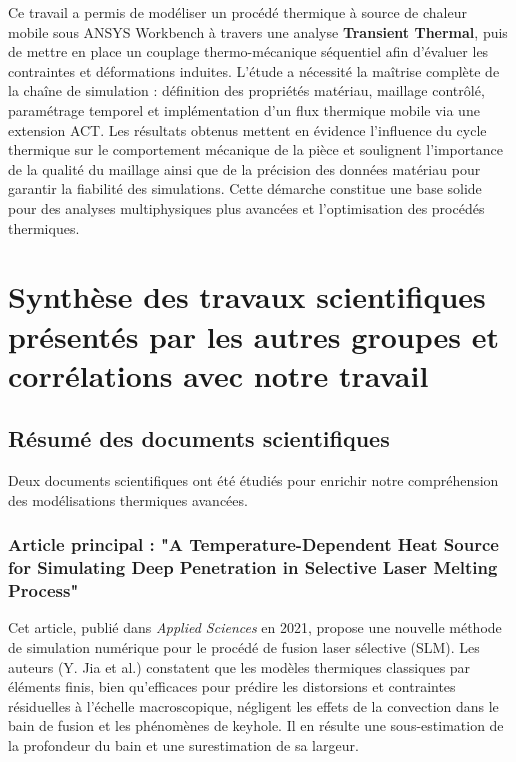 \documentclass{rapportECL}
\begin{document}
Ce travail a permis de modéliser un procédé thermique à source de chaleur mobile sous ANSYS Workbench à travers une analyse \textbf{Transient Thermal}, puis de mettre en place un couplage thermo-mécanique séquentiel afin d’évaluer les contraintes et déformations induites. L’étude a nécessité la maîtrise complète de la chaîne de simulation : définition des propriétés matériau, maillage contrôlé, paramétrage temporel et implémentation d’un flux thermique mobile via une extension ACT. Les résultats obtenus mettent en évidence l’influence du cycle thermique sur le comportement mécanique de la pièce et soulignent l’importance de la qualité du maillage ainsi que de la précision des données matériau pour garantir la fiabilité des simulations. Cette démarche constitue une base solide pour des analyses multiphysiques plus avancées et l’optimisation des procédés thermiques.

\newpage

\section{Synthèse des travaux scientifiques présentés par les autres groupes et corrélations avec notre travail}

\subsection{Résumé des documents scientifiques}

Deux documents scientifiques ont été étudiés pour enrichir notre compréhension des modélisations thermiques avancées.

\subsubsection{Article principal : "A Temperature-Dependent Heat Source for Simulating Deep Penetration in Selective Laser Melting Process"}

Cet article, publié dans \textit{Applied Sciences} en 2021, propose une nouvelle méthode de simulation numérique pour le procédé de fusion laser sélective (SLM). Les auteurs (Y. Jia et al.) constatent que les modèles thermiques classiques par éléments finis, bien qu’efficaces pour prédire les distorsions et contraintes résiduelles à l’échelle macroscopique, négligent les effets de la convection dans le bain de fusion et les phénomènes de keyhole. Il en résulte une sous-estimation de la profondeur du bain et une surestimation de sa largeur.
\end{document}
